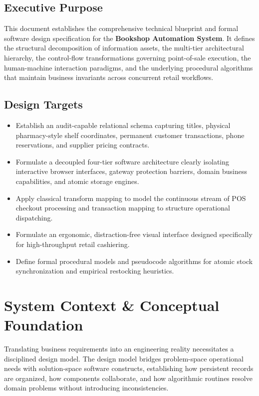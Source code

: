 \documentclass[12pt, a4paper]{report}
\begin{document}
\section*{Executive Purpose}
This document establishes the comprehensive technical blueprint and formal software design specification for the \textbf{Bookshop Automation System}. It defines the structural decomposition of information assets, the multi-tier architectural hierarchy, the control-flow transformations governing point-of-sale execution, the human-machine interaction paradigms, and the underlying procedural algorithms that maintain business invariants across concurrent retail workflows.

\section*{Design Targets}
\begin{itemize}[leftmargin=1.5em]
  \item Establish an audit-capable relational schema capturing titles, physical pharmacy-style shelf coordinates, permanent customer transactions, phone reservations, and supplier pricing contracts.
  \item Formulate a decoupled four-tier software architecture clearly isolating interactive browser interfaces, gateway protection barriers, domain business capabilities, and atomic storage engines.
  \item Apply classical transform mapping to model the continuous stream of POS checkout processing and transaction mapping to structure operational dispatching.
  \item Formulate an ergonomic, distraction-free visual interface designed specifically for high-throughput retail cashiering.
  \item Define formal procedural models and pseudocode algorithms for atomic stock synchronization and empirical restocking heuristics.
\end{itemize}

\chapter{System Context \& Conceptual Foundation}
Translating business requirements into an engineering reality necessitates a disciplined design model. The design model bridges problem-space operational needs with solution-space software constructs, establishing how persistent records are organized, how components collaborate, and how algorithmic routines resolve domain problems without introducing inconsistencies.
\end{document}
